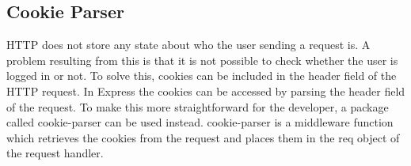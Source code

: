 \subsection{Cookie Parser}
HTTP does not store any state about who the user sending a request is. A problem resulting from this is that it is not possible to check whether the user is logged in or not. To solve this, cookies can be included in the header field of the HTTP request. In Express the cookies can be accessed by parsing the header field of the request. To make this more straightforward for the developer, a package called cookie-parser\cite{cookie-parser:Info} can be used instead. cookie-parser is a middleware function which retrieves the cookies from the request and places them in the req object of the request handler.